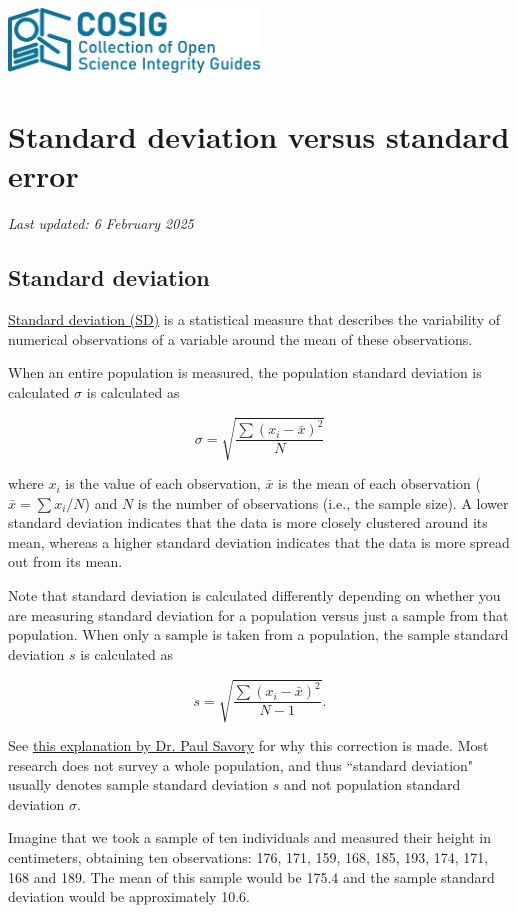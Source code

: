 \documentclass[letterpaper, 12pt]{article}
\begin{document}
\flushleft
\includegraphics[width=0.5\textwidth]{img/home/241017_final_logo_mockup.png}

\section*{Standard deviation versus standard error}
\textit{Last updated: 6 February 2025}

\subsection*{Standard deviation}

\href{https://en.wikipedia.org/wiki/Standard_deviation}{Standard deviation (SD)} is a statistical measure that describes the variability of numerical observations of a variable around the mean of these observations.

When an entire population is measured, the population standard deviation is calculated $\sigma$ is calculated as 

$$
\sigma = \sqrt{\frac{\sum(x_i - \bar{x})^2}{N}}
$$

where $x_i$ is the value of each observation, $\bar{x}$ is the mean of each observation ($\bar{x} = \sum x_i / N$) and $N$ is the number of observations (i.e., the sample size). A lower standard deviation indicates that the data is more closely clustered around its mean, whereas a higher standard deviation indicates that the data is more spread out from its mean.

Note that standard deviation is calculated differently depending on whether you are measuring standard deviation for a population versus just a sample from that population. When only a sample is taken from a population, the sample standard deviation $s$ is calculated as 

$$
s = \sqrt{\frac{\sum(x_i - \bar{x})^2}{N-1}}.
$$

See \href{https://digitalcommons.unl.edu/cgi/viewcontent.cgi?article=1008&context=imseteach}{this explanation by Dr. Paul Savory} for why this correction is made. Most research does not survey a whole population, and thus ``standard deviation" usually denotes sample standard deviation $s$ and not population standard deviation $\sigma$.

Imagine that we took a sample of ten individuals and measured their height in centimeters, obtaining ten observations: 176, 171, 159, 168, 185, 193, 174, 171, 168 and 189. The mean of this sample would be 175.4 and the sample standard deviation would be approximately 10.6.
\end{document}
